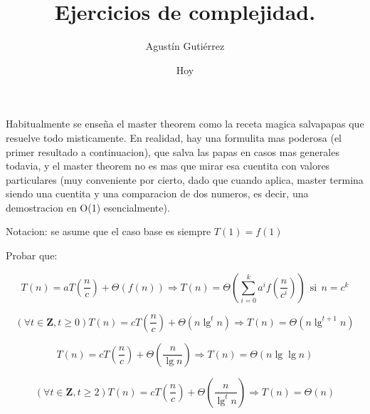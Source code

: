 \documentclass[12pt]{article}
\title{Ejercicios de complejidad.}
\author{Agust\'in Guti\'errez}
\date{Hoy}
\begin{document}
  \maketitle
  
Habitualmente se ense\~na el master theorem como la receta magica salvapapas que resuelve todo misticamente. En realidad, hay una formulita mas poderosa (el primer resultado a continuacion), que salva las papas en casos mas generales todavia, y el master theorem no es mas que mirar esa cuentita con valores particulares (muy conveniente por cierto, dado que cuando aplica, master termina siendo una cuentita y una comparacion de dos numeros, es decir, una demostracion en O(1) esencialmente).

Notacion: se asume que el caso base es siempre $T(1) = f(1)$
  
Probar que:

$$ T \left(n \right) = a T \left( \frac{n}{c} \right) + \Theta \left ( f \left( n \right) \right ) \Rightarrow T \left(n \right) = \Theta \left ( \sum_{i=0}^{k}{a^i f \left ( \frac{n}{c^i} \right )} \right ) \ \ \mbox{si}\ \  n = c^k$$

$$ \left ( \forall t \in \mathbf {Z}, t \geq 0 \right )T \left(n \right) = c T \left( \frac{n}{c} \right) + \Theta \left( n \lg^t n \right) \Rightarrow T \left(n \right) = \Theta \left( n \lg^{t+1}{n} \right)$$

$$T \left(n \right) = c T \left( \frac{n}{c} \right) + \Theta \left( \frac{n}{\lg n} \right) \Rightarrow T \left(n \right) = \Theta \left( n \lg{\lg{n}} \right)$$

$$ \left ( \forall t \in \mathbf {Z}, t \geq 2 \right )T \left(n \right) = c T \left( \frac{n}{c} \right) + \Theta \left( \frac{n}{\lg^{t}{n}} \right) \Rightarrow T \left(n \right) = \Theta \left( n \right)$$
\end{document}
